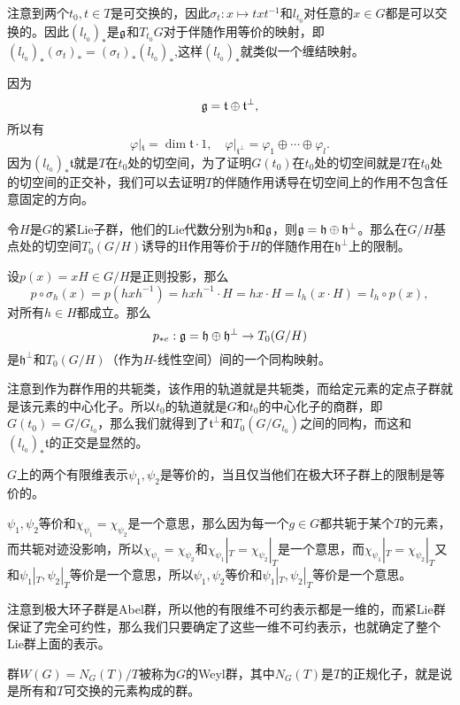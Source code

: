 注意到两个$t_0,t\in T$是可交换的，因此$\sigma_t:x\mapsto txt^{-1}$和$l_{t_0}$对任意的$x\in G$都是可以交换的。因此$(l_{t_0})_*$是${\mathfrak{g}}$和$T_{t_0}G$对于伴随作用等价的映射，即$(l_{t_0})_*(\sigma_t)_*=(\sigma_t)_*(l_{t_0})_*$,这样$(l_{t_0})_*$就类似一个缠结映射。

因为
\[
{\mathfrak{g}}=\mathfrak{t}\oplus\mathfrak{t}^\bot,
\]
所以有
\[
\varphi|_\mathfrak{t}=\dim \mathfrak{t}\cdot 1,\quad \varphi|_{\mathfrak{t}^\bot}=\varphi_1\oplus\cdots \oplus \varphi_l.
\]
因为$(l_{t_0})_*\mathfrak{t}$就是$T$在$t_0$处的切空间，为了证明$G(t_0)$在$t_0$处的切空间就是$T$在$t_0$处的切空间的正交补，我们可以去证明$T$的伴随作用诱导在切空间上的作用不包含任意固定的方向。

\pro 令$H$是$G$的紧Lie子群，他们的Lie代数分别为$\mathfrak{h}$和${\mathfrak{g}}$，则${\mathfrak{g}}=\mathfrak{h}\oplus\mathfrak{h}^\bot$。那么在$G/H$基点处的切空间$T_0(G/H)$诱导的H作用等价于$H$的伴随作用在$\mathfrak{h}^\bot$上的限制。

设$p(x)=xH\in G/H$是正则投影，那么
\[
p\circ \sigma_h(x)=p(hxh^{-1})=hxh^{-1}\cdot H=hx\cdot H=l_h(x\cdot H)=l_h\circ p(x),
\]
对所有$h\in H$都成立。那么
\[
p_{*e}:{\mathfrak{g}}=\mathfrak{h}\oplus\mathfrak{h}^\bot\to T_0(G/H)
\]
是$\mathfrak{h}^\bot$和$T_0(G/H)$（作为$H$-线性空间）间的一个同构映射。

注意到作为群作用的共轭类，该作用的轨道就是共轭类，而给定元素的定点子群就是该元素的中心化子。所以$t_0$的轨道就是$G$和$t_0$的中心化子的商群，即$G(t_0)=G/G_{t_0}$，那么我们就得到了$\mathfrak{t}^\bot$和$T_0(G/G_{t_0})$之间的同构，而这和$(l_{t_0})_*\mathfrak{t}$的正交是显然的。

\theo $G$上的两个有限维表示$\psi_1,\psi_2$是等价的，当且仅当他们在极大环子群上的限制是等价的。

$\psi_1,\psi_2$等价和$\chi_{\psi_1}=\chi_{\psi_2}$是一个意思，那么因为每一个$g\in G$都共轭于某个$T$的元素，而共轭对迹没影响，所以$\chi_{\psi_1}=\chi_{\psi_2}$和$\chi_{\psi_1}|_T=\chi_{\psi_2}|_T$是一个意思，而$\chi_{\psi_1}|_T=\chi_{\psi_2}|_T$又和$\psi_1|_T,\psi_2|_T$等价是一个意思，所以$\psi_1,\psi_2$等价和$\psi_1|_T,\psi_2|_T$等价是一个意思。

注意到极大环子群是Abel群，所以他的有限维不可约表示都是一维的，而紧Lie群保证了完全可约性，那么我们只要确定了这些一维不可约表示，也就确定了整个Lie群上面的表示。

\para 群$W(G)=N_G(T)/T$被称为$G$的Weyl群，其中$N_G(T)$是$T$的正规化子，就是说是所有和$T$可交换的元素构成的群。